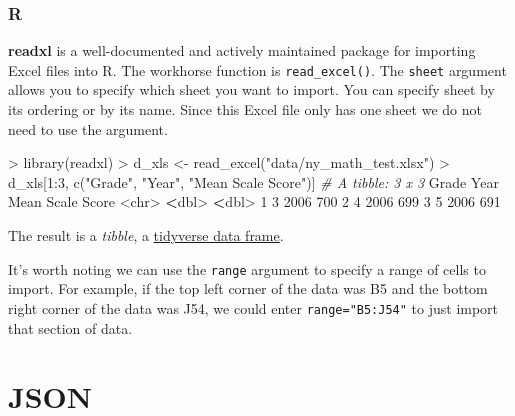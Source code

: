 \documentclass[
]{book}
\newenvironment{Shaded}{\begin{snugshade}}{\end{snugshade}}
\newcommand{\AttributeTok}[1]{\textcolor[rgb]{0.77,0.63,0.00}{#1}}
\newcommand{\CommentTok}[1]{\textcolor[rgb]{0.56,0.35,0.01}{\textit{#1}}}
\newcommand{\DecValTok}[1]{\textcolor[rgb]{0.00,0.00,0.81}{#1}}
\newcommand{\ErrorTok}[1]{\textcolor[rgb]{0.64,0.00,0.00}{\textbf{#1}}}
\newcommand{\FunctionTok}[1]{\textcolor[rgb]{0.00,0.00,0.00}{#1}}
\newcommand{\NormalTok}[1]{#1}
\newcommand{\OtherTok}[1]{\textcolor[rgb]{0.56,0.35,0.01}{#1}}
\newcommand{\SpecialCharTok}[1]{\textcolor[rgb]{0.00,0.00,0.00}{#1}}
\newcommand{\StringTok}[1]{\textcolor[rgb]{0.31,0.60,0.02}{#1}}
\begin{document}
\hypertarget{r-11}{%
\subsubsection*{R}\label{r-11}}

\textbf{readxl} is a well-documented and actively maintained package for importing Excel files into R. The workhorse function is \texttt{read\_excel()}. The \texttt{sheet} argument allows you to specify which sheet you want to import. You can specify sheet by its ordering or by its name. Since this Excel file only has one sheet we do not need to use the argument.

\begin{Shaded}
\begin{Highlighting}[]
\SpecialCharTok{\textgreater{}} \FunctionTok{library}\NormalTok{(readxl)}
\SpecialCharTok{\textgreater{}}\NormalTok{ d\_xls }\OtherTok{\textless{}{-}} \FunctionTok{read\_excel}\NormalTok{(}\StringTok{"data/ny\_math\_test.xlsx"}\NormalTok{)}
\SpecialCharTok{\textgreater{}}\NormalTok{ d\_xls[}\DecValTok{1}\SpecialCharTok{:}\DecValTok{3}\NormalTok{, }\FunctionTok{c}\NormalTok{(}\StringTok{"Grade"}\NormalTok{, }\StringTok{"Year"}\NormalTok{, }\StringTok{"Mean Scale Score"}\NormalTok{)]}
\CommentTok{\# A tibble: 3 x 3}
\NormalTok{  Grade  Year }\StringTok{\textasciigrave{}}\AttributeTok{Mean Scale Score}\StringTok{\textasciigrave{}}
  \SpecialCharTok{\textless{}}\NormalTok{chr}\SpecialCharTok{\textgreater{}} \ErrorTok{\textless{}}\NormalTok{dbl}\SpecialCharTok{\textgreater{}}              \ErrorTok{\textless{}}\NormalTok{dbl}\SpecialCharTok{\textgreater{}}
\DecValTok{1} \DecValTok{3}      \DecValTok{2006}                \DecValTok{700}
\DecValTok{2} \DecValTok{4}      \DecValTok{2006}                \DecValTok{699}
\DecValTok{3} \DecValTok{5}      \DecValTok{2006}                \DecValTok{691}
\end{Highlighting}
\end{Shaded}

The result is a \emph{tibble}, a \href{https://tibble.tidyverse.org/}{tidyverse data frame}.

It's worth noting we can use the \texttt{range} argument to specify a range of cells to import. For example, if the top left corner of the data was B5 and the bottom right corner of the data was J54, we could enter \texttt{range="B5:J54"} to just import that section of data.

\hypertarget{json}{%
\section{JSON}\label{json}}
\end{document}
